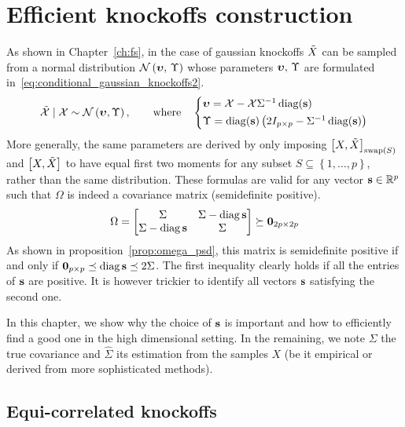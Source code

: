 \chapter{Efficient knockoffs construction}\label{ch:sdp}

As shown in Chapter~\ref{ch:fs}, in the case of gaussian knockoffs
$\tilde{X}$ can be sampled from a normal distribution $\mathcal{N}\left( \bm{\upsilon},\, \Upsilon \right)$ whose parameters
$\bm{\upsilon},\, \Upsilon$ are formulated in~\ref{eq:conditional_gaussian_knockoffs2}.
\begin{equation}\label{eq:conditional_gaussian_knockoffs2}
    \tcX \mid \cX \sim \cN\left( \bupsilon, \Upsilon \right)
    ,\qquad\text{where}\quad
    \begin{cases*}
        \bupsilon = \cX - \cX\Sigma^{-1}\diag(\bs)\\
        \Upsilon = \diag(\bs)\left( 2I_{p \times p} - \Sigma^{-1}\diag(\bs) \right)
    \end{cases*}
\end{equation}
More generally, the same parameters are derived by only imposing
$\big[ X, \tilde{X} \big]_{\operatorname{swap}\left( S \right)}$ and $\big[ X, \tilde{X} \big]$
to have equal first two moments
for any subset
$S \subseteq \left\{ 1, \dots, p \right\}$,
rather than the same distribution.
These formulas are valid for any vector $\mathbf{s} \in \mathbb{R}^p$ such that $\Omega$
is indeed a covariance matrix (semidefinite positive).
\begin{equation*}
    \Omega = \begin{bmatrix}
        \Sigma & \Sigma - \operatorname*{diag} \mathbf{s}\\
        \Sigma - \operatorname*{diag} \mathbf{s} & \Sigma
    \end{bmatrix}
    \succeq \mathbf{0}_{2p \times 2p}
\end{equation*}
As shown in proposition~\ref{prop:omega_psd},
this matrix is semidefinite positive if and only if $\mathbf{0}_{p \times p} \preceq \operatorname*{diag} \mathbf{s} \preceq 2 \Sigma$.
The first inequality clearly holds if all the entries of $\mathbf{s}$ are positive.
It is however trickier to identify all vectors $\mathbf{s}$ satisfying the second one.

In this chapter, we show why the choice of $\mathbf{s}$ is important and how to efficiently find a good one
in the high dimensional setting.
In the remaining, we note $\Sigma$ the true covariance and $\hat{\Sigma}$ its estimation from the samples $X$
(be it empirical or derived from more sophisticated methods).

\section{Equi-correlated knockoffs}\label{sec:equi}

